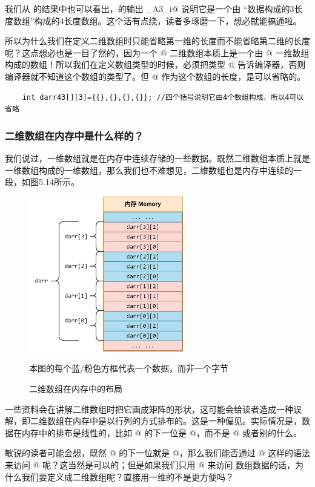 我们从 \lstinline@typeid@ 的结果中也可以看出，\lstinline@darr@ 的输出 _A3_i@ 说明它是一个由 ``\lstinline@int@ 数据构成的3长度数组''构成的4长度数组。这个话有点绕，读者多琢磨一下，想必就能搞通啦。\par
所以为什么我们在定义二维数组时只能省略第一维的长度而不能省略第二维的长度呢？这点想必也是一目了然的，因为一个 \lstinline@int[4][3]@ 二维数组本质上是一个由 \lstinline@int[3]@ 一维数组构成的数组！所以我们在定义数组类型的时候，必须把类型 \lstinline@int[3]@ 告诉编译器，否则编译器就不知道这个数组的类型了。但 @ 作为这个数组的长度，是可以省略的。
\begin{lstlisting}
    int darr43[][3]={{},{},{},{}}; //四个括号说明它由4个数组构成，所以4可以省略
\end{lstlisting}\par
\subsubsection*{二维数组在内存中是什么样的？}
我们说过，一维数组就是在内存中连续存储的一些数据。既然二维数组本质上就是一维数组构成的一维数组，那么我们也不难想见，二维数组也是内存中连续的一段，如图5.14所示。\par
\begin{figure}[htbp]
    \centering
    \includegraphics[width=0.6\textwidth]{../images/generalized_parts/05_data_in_the_array_of_array_300.png}
    \caption{二维数组在内存中的布局}
    \footnotesize{本图的每个蓝/粉色方框代表一个数据，而非一个字节}
\end{figure}
一些资料会在讲解二维数组时把它画成矩阵的形状，这可能会给读者造成一种误解，即二维数组在内存中是以行列的方式排布的。这是一种偏见。实际情况是，数据在内存中的排布是线性的，比如 \lstinline@darr[0][3]@ 的下一位是 \lstinline@darr[1][0]@，而不是 \lstinline@darr[1][3]@ 或者别的什么。\par
敏锐的读者可能会想，既然 \lstinline@darr[0][3]@ 的下一位就是 \lstinline@darr[1][0]@，那么我们能否通过 \lstinline@darr[0][4]@ 这样的语法来访问 \lstinline@darr[1][0]@ 呢？这当然是可以的；但是如果我们只用 \lstinline@darr[0][i]@ 来访问 数组数据的话，为什么我们要定义成二维数组呢？直接用一维的不是更方便吗？\par
